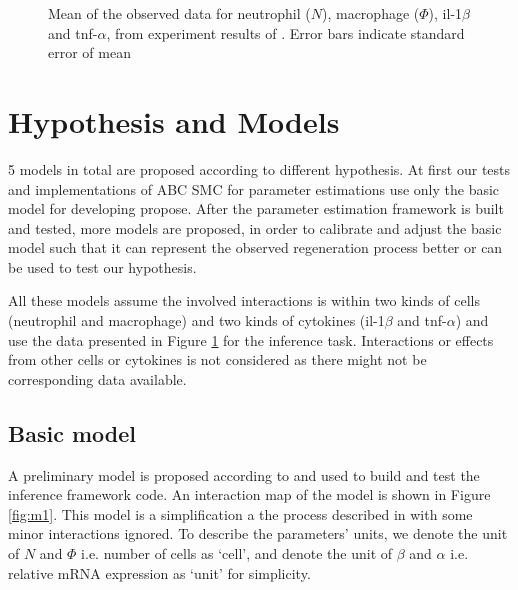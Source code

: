\documentclass[12pt,a4paper]{report}
\begin{document}
\begin{figure}
    \begin{center}
    \end{center}

    \caption[Mean of the observed data]%
    {Mean of the observed data for neutrophil ($N$), macrophage ($\Phi$), il-1$\beta$ and tnf-$\alpha$, from experiment results of \cite{ref:Tsarouchas}. Error bars indicate standard error of mean}
    \label{fig:obs_data}

\end{figure}

\section{Hypothesis and Models}

5 models in total are proposed according to different hypothesis. At first our tests and implementations of ABC SMC for parameter estimations use only the basic model for developing propose. After the parameter estimation framework is built and tested, more models are proposed, in order to calibrate and adjust the basic model such that it can represent the observed regeneration process better or can be used to test our hypothesis.

All these models assume the involved interactions is within two kinds of cells (neutrophil and macrophage) and two kinds of cytokines (il-1$\beta$ and tnf-$\alpha$) and use the data presented in Figure \ref{fig:obs_data} for the inference task. Interactions or effects from other cells or cytokines is not considered as there might not be corresponding data available.

\subsection{Basic model}

A preliminary model is proposed according to \cite{ref:Tsarouchas} and used to build and test the inference framework code. An interaction map of the model is shown in Figure \ref{fig:m1}. This model is a simplification a the process described in \cite{ref:Tsarouchas} with some minor interactions ignored. To describe the parameters' units, we denote the unit of $N$ and $\Phi$ i.e. number of cells as `cell', and denote the unit of $\beta$ and $\alpha$ i.e. relative mRNA expression as `unit' for simplicity.
\end{document}

